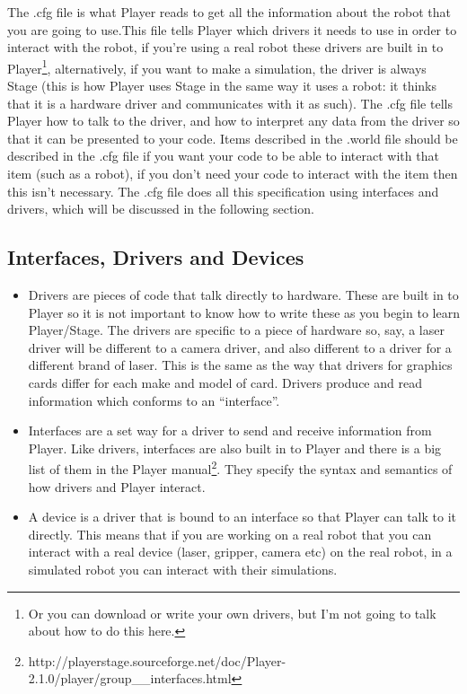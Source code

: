 \documentclass[a4paper]{report}
\newcommand{\plst}{Player/Stage\xspace}
\newcommand{\pl}{Player\xspace}
\begin{document}
The .cfg file is what \pl reads to get all the information about the robot that you are going to use.This file tells \pl which drivers it needs to use in order to interact with the robot, if you're using a real robot these drivers are built in to \pl\footnote{Or you can download or write your own drivers, but I'm not going to talk about how to do this here.}, alternatively, if you want to make a simulation, the driver is always Stage (this is how \pl uses Stage in the same way it uses a robot: it thinks that it is a hardware driver and communicates with it as such). The .cfg file tells \pl how to talk to the driver, and how to interpret any data from the driver so that it can be presented to your code. Items described in the .world file should be described in the .cfg file if you want your code to be able to interact with that item (such as a robot), if you don't need your code to interact with the item then this isn't necessary. The .cfg file does all this specification using interfaces and drivers, which will be discussed in the following section.

\subsection{Interfaces, Drivers and Devices} \label{sec:interfaceDriverDevices}
\begin{itemize}
\item Drivers are pieces of code that talk directly to hardware. These are built in to \pl so it is not important to know how to write these as you begin to learn \plst. The drivers are specific to a piece of hardware so, say, a laser driver will be different to a camera driver, and also different to a driver for a different brand of laser. This is the same as the way that drivers for graphics cards differ for each make and model of card. Drivers produce and read information which conforms to an ``interface''.

\item Interfaces are a set way for a driver to send and receive information from \pl. Like drivers, interfaces are also built in to \pl and there is a big list of them in the \pl manual\footnote{http://playerstage.sourceforge.net/doc/\pl-2.1.0/player/group\_\_interfaces.html}. They specify the syntax and semantics of how drivers and \pl interact.
	
\item A device is a driver that is bound to an interface so that \pl can talk to it directly. This means that if you are working on a real robot that you can interact with a real device (laser, gripper, camera etc) on the real robot, in a simulated robot you can interact with their simulations. 
\end{itemize}
\end{document}
